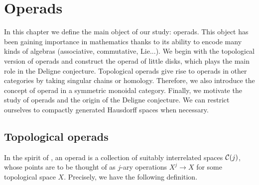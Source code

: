 \documentclass[TFM.tex]{subfiles}
\begin{document}
\chapter{Operads}\label{3}


In this chapter we define the main object of our study: operads. This object has been gaining importance in mathematics thanks to its ability to encode many kinds of algebras (associative, commutative, Lie...). We begin with the topological version of operads and construct the operad of little disks, which plays the main role in the Deligne conjecture. Topological operads give rise to operads in other categories by taking singular chains or homology. Therefore, we also introduce the concept of operad in a symmetric monoidal category. Finally, we motivate the study of operads and the origin of the Deligne conjecture. We can restrict ourselves to compactly generated Hausdorff spaces when necessary. 




\section{Topological operads}
%
In the spirit of \cite{May}, an operad is a collection of suitably interrelated spaces $\mathcal{C}(j)$, whose points are to
be thought of as $j$-ary operations $X^j \to X$ for some topological space $X$. Precisely, we have the following definition.
\end{document}
